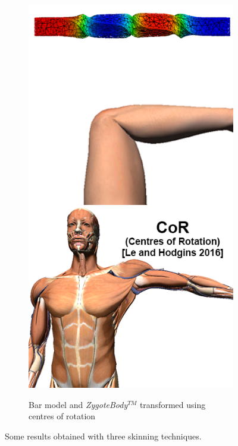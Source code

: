 \begin{figure}[ht]
\begin{subfigure}[b]{0.32\linewidth}
        \centering
        {\includegraphics[width=\linewidth]{IMG/sCOR.png}}
        \caption{ Bar model and \emph{ZygoteBody}$^{TM}$ transformed using centres of rotation \label{subfig:sCOR}}
    \end{subfigure}
    \caption{\label{fig:compsummary} Some results obtained with three skinning techniques.}
   \end{figure}
